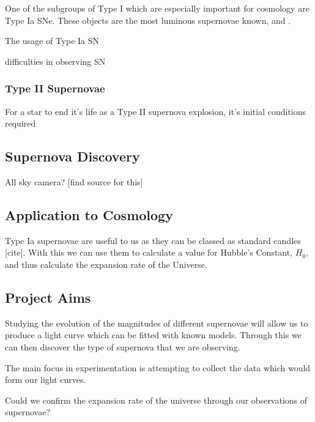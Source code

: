 \documentclass[twocolumn]{revtex4}
\begin{document}
One of the subgroups of Type I which are especially important for cosmology are Type Ia SNe. These objects are the most luminous supernovae known, and \cite{posn}.

The usage of Type Ia SN 

difficulties in observing SN

\vspace{-3ex}
\subsubsection{Type II Supernovae}
\vspace{-2ex}

For a star to end it's life as a Type II supernova explosion, it's initial conditions required 

\vspace{-3ex}
\subsection{Supernova Discovery}
\vspace{-2ex}

All sky camera? [find source for this]

\vspace{-3ex}
\subsection{Application to Cosmology}
\vspace{-2ex}

Type Ia supernovae are useful to us as they can be classed as standard candles [cite]. With this we can use them to calculate a value for Hubble's Constant, $H_0$, and thus calculate the expansion rate of the Universe.

\vspace{-3ex}
\subsection{Project Aims}
\vspace{-2ex}

Studying the evolution of the magnitudes of different supernovae will allow us to produce a light curve which can be fitted with known models. Through this we can then discover the type of supernova that we are observing. 

The main focus in experimentation is attempting to collect the data which would form our light curves. 

Could we confirm the expansion rate of the universe through our observations of supernovae? 
\end{document}

